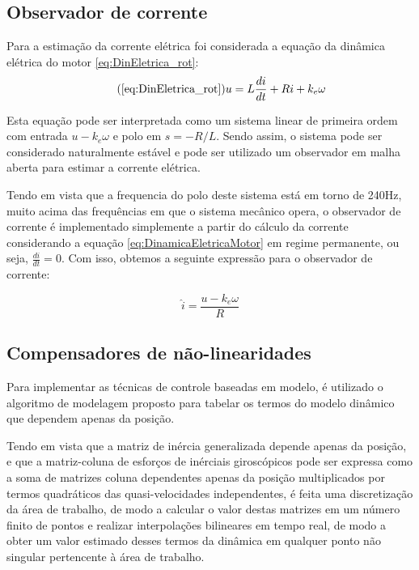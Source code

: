 \documentclass[]{politex}
\begin{document}
\subsection{Observador de corrente}

Para a estimação da corrente elétrica foi considerada a equação da dinâmica elétrica do motor \eqref{eq:DinEletrica_rot}:
\begin{equation}
\tag{\ref{eq:DinEletrica_rot}} \label{eq:DinamicaEletricaMotor}
	   u = L \frac{di}{dt} + R i + k_{e} \omega
\end{equation}

Esta equação pode ser interpretada como um sistema linear de primeira ordem com entrada $u - k_{e} \omega $ e polo em $s = -R/L$. Sendo assim, o sistema pode ser considerado naturalmente estável e pode ser utilizado um observador em malha aberta para estimar a corrente elétrica.

Tendo em vista que a frequencia do polo deste sistema está em torno de 240Hz, muito acima das frequências em que o sistema mecânico opera, o observador de corrente é implementado simplemente a partir do cálculo da corrente considerando a equação \eqref{eq:DinamicaEletricaMotor} em regime permanente, ou seja, $\frac{di}{dt} = 0$. Com isso, obtemos a seguinte expressão para o observador de corrente:

\begin{equation}
\label{corrente}
\hat{i} = \frac{u - k_e \omega}{R}
\end{equation}

\subsection{Compensadores de não-linearidades}

Para implementar as técnicas de controle baseadas em modelo, é utilizado o algoritmo de modelagem proposto para tabelar os termos do modelo dinâmico que dependem apenas da posição.

Tendo em vista que a matriz de inércia generalizada depende apenas da posição, e que a matriz-coluna de esforços de inérciais giroscópicos pode ser expressa como a soma de matrizes coluna dependentes apenas da posição multiplicados por termos quadráticos das quasi-velocidades independentes, é feita uma discretização da área de trabalho, de modo a calcular o valor destas matrizes em um número finito de pontos e realizar interpolações bilineares em tempo real, de modo a obter um valor estimado desses termos da dinâmica em qualquer ponto não singular pertencente à área de trabalho.
\end{document}
